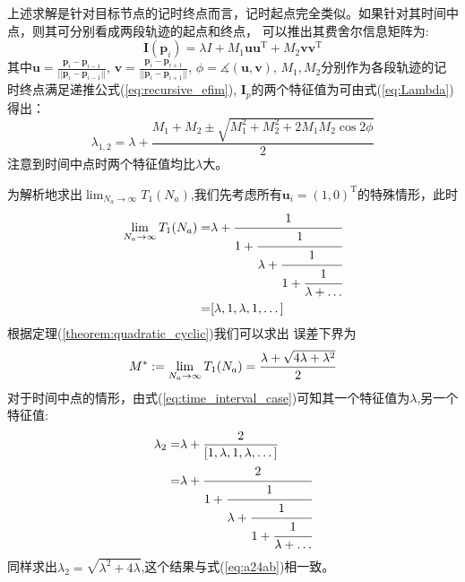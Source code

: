 \begin{remark}
上述求解是针对目标节点的记时终点而言，记时起点完全类似。如果针对其时间中点，则其可分别看成两段轨迹的起点和终点，
可以推出其费舍尔信息矩阵为:
\[
\bm{I}(\bm{p}_i)=\lambda I+M_1\bm{u}\bm{u}^{\textrm{T}} +M_2\bm{v}\bm{v}^{\textrm{T}}
\]
其中$\bm{u}=\frac{\bm{p}_i-\bm{p}_{i-1}}{||\bm{p}_i-\bm{p}_{i-1}||}$,
$\bm{v}=\frac{\bm{p}_i-\bm{p}_{i+1}}{||\bm{p}_i-\bm{p}_{i+1}||}$,
$\phi=\measuredangle(\bm{u},\bm{v})$,
$M_1,M_2$分别作为各段轨迹的记时终点满足递推公式(\ref{eq:recursive_efim}),
$\bm{I}_p$的两个特征值为可由式(\ref{eq:Lambda})得出：
\begin{equation}\label{eq:time_interval_case}
\lambda_{1,2}=\lambda+\frac{M_1+M_2\pm \sqrt{M_1^2+M_2^2+2M_1M_2\cos2\phi}}{2}
\end{equation}
注意到时间中点时两个特征值均比$\lambda$大。
\end{remark}
为解析地求出$\lim_{N_a\to \infty}T_1(N_a)$,我们先考虑所有$\bm{u}_i=(1,0)^{\textrm{T}} $的特殊情形，此时
\begin{align}\notag\label{eq:gcf_1}
\lim_{N_a\to \infty}T_1(N_a)=&\lambda+\cfrac{1}{1+\cfrac{1}{\lambda+\cfrac{1}{1+\cfrac{1}{\lambda+\dots}}}}\\
=&[\lambda,1,\lambda,1,\dots]
\end{align}
根据定理(\ref{theorem:quadratic_cyclic})我们可以求出
误差下界为
\begin{equation}\notag\label{eq:starting_or_ending}
M^*:=\lim_{N_a\to \infty}T_1(N_a)=\frac{\lambda+\sqrt{4\lambda+\lambda^2}}{2}
\end{equation}
对于时间中点的情形，由式(\ref{eq:time_interval_case})可知其一个特征值为$\lambda$,另一个特征值:
\begin{align}\notag
\lambda_2=&\lambda+\frac{2}{[1,\lambda,1,\lambda,\dots]}\\
=&\lambda+\cfrac{2}{1+\cfrac{1}{\lambda+\cfrac{1}{1+\cfrac{1}{\lambda+\dots}}}}
\end{align}
同样求出$\lambda_2=\sqrt{\lambda^2+4\lambda}$,这个结果与式(\ref{eq:a24ab})相一致。


